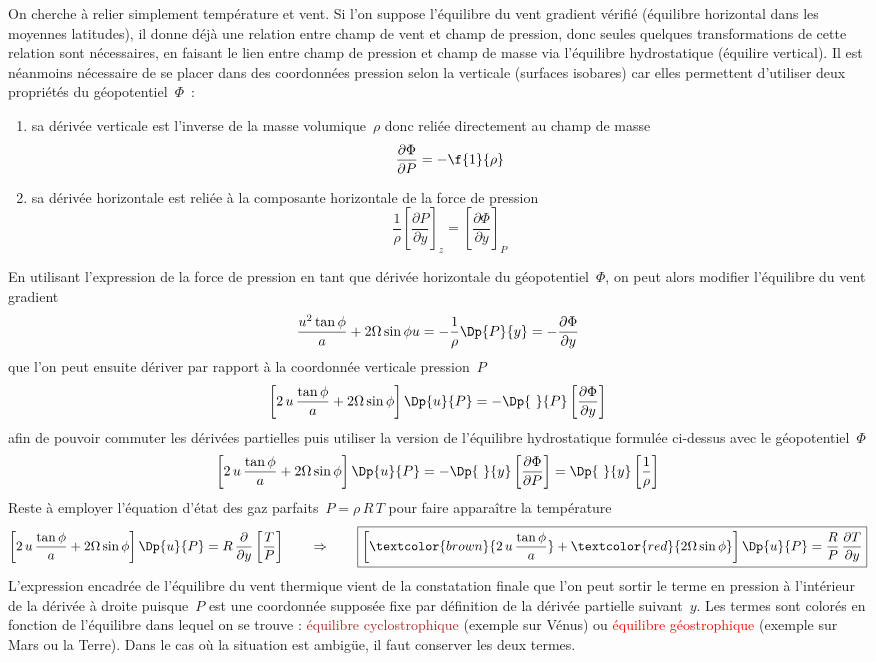 \sk
On cherche à relier simplement température et vent. Si l'on suppose l'équilibre du vent gradient vérifié (équilibre horizontal dans les moyennes latitudes), il donne déjà une relation entre champ de vent et champ de pression, donc seules quelques transformations de cette relation sont nécessaires, en faisant le lien entre champ de pression et champ de masse via l'équilibre hydrostatique (équilire vertical). Il est néanmoins nécessaire de se placer dans des coordonnées pression selon la verticale (surfaces isobares) car elles permettent d'utiliser deux propriétés du géopotentiel~$\Phi$~: 
\begin{enumerate}
\item sa dérivée verticale est l'inverse de la masse volumique~$\rho$ donc reliée directement au champ de masse
\[ \frac{\partial \Phi}{\partial P} = -\f{1}{\rho} \]
\item sa dérivée horizontale est reliée à la composante horizontale de la force de pression
\[ \frac{1}{\rho} \left[ \frac{\partial P}{\partial y} \right]_z
= \left[ \frac{\partial \Phi}{\partial y} \right]_P \]
\end{enumerate}

\sk
En utilisant l'expression de la force de pression en tant que dérivée horizontale du géopotentiel~$\Phi$, on peut alors modifier l'équilibre du vent gradient
\[ \dfrac{u^2\tan\phi}{a} + 2\Omega\sin\phi u = -\dfrac{1}{\rho}\Dp{P}{y} = - \frac{\partial \Phi}{\partial y} \]
\noindent que l'on peut ensuite dériver par rapport à la coordonnée verticale pression~$P$ 
\[ \left[ 2 \, u \, \dfrac{\tan\phi}{a} + 2\Omega\sin\phi \right] \Dp{u}{P} = - \Dp{~}{P} \left[ \frac{\partial \Phi}{\partial y} \right] \]
\noindent afin de pouvoir commuter les dérivées partielles puis utiliser la version de l'équilibre hydrostatique formulée ci-dessus avec le géopotentiel~$\Phi$
\[ \left[ 2 \, u \, \dfrac{\tan\phi}{a} + 2\Omega\sin\phi \right] \Dp{u}{P} = - \Dp{~}{y} \left[\frac{\partial \Phi}{\partial P} \right] = \Dp{~}{y} \left[ \frac{1}{\rho} \right] \]
\noindent Reste à employer l'équation d'état des gaz parfaits~$P=\rho\,R\,T$ pour faire apparaître la température
\[ \left[ 2 \, u \, \dfrac{\tan\phi}{a} + 2\Omega\sin\phi \right] \Dp{u}{P} = R \, \frac{\partial}{\partial y} \left[ \frac{T}{P} \right] 
\qquad \Rightarrow \qquad
\boxed{ \left[ \textcolor{brown}{2\,u\,\frac{\tan\phi}{a}} + \textcolor{red}{2\Omega\sin\phi} \right] \Dp{u}{P} = \frac{R}{P} \, \frac{\partial T}{\partial y} }
\]
\noindent L'expression encadrée de l'équilibre du vent thermique vient de la constatation finale que l'on peut sortir le terme en pression à l'intérieur de la dérivée à droite puisque~$P$ est une coordonnée supposée fixe par définition de la dérivée partielle suivant~$y$. Les termes sont colorés en fonction de l'équilibre dans lequel on se trouve : \textcolor{brown}{équilibre cyclostrophique} (exemple sur Vénus) ou \textcolor{red}{équilibre géostrophique} (exemple sur Mars ou la Terre). Dans le cas où la situation est ambigüe, il faut conserver les deux termes.

